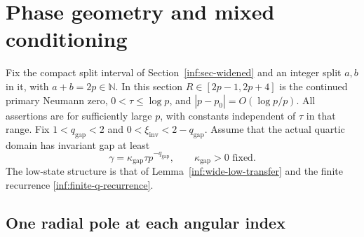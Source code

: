 \section{Phase geometry and mixed conditioning}\label{inf:sec-conditioning}

Fix the compact split interval of Section~\ref{inf:sec-widened}
and an integer split $a,b$ in it, with $a+b=2p\in\mathbb N$.
In this section $R\in[2p-1,2p+4]$ is the continued primary Neumann
zero, $0<\tau\le\log p$, and $|p-p_0|=O(\log p/p)$.
All assertions are for sufficiently large $p$, with constants
independent of $\tau$ in that range. Fix
$1<q_{\mathrm{gap}}<2$ and $0<\xi_{\mathrm{inv}}<2-q_{\mathrm{gap}}$.
Assume that the actual quartic domain has invariant gap at least
\[
 \gamma=\kappa_{\mathrm{gap}}\tau p^{-q_{\mathrm{gap}}},\qquad
 \kappa_{\mathrm{gap}}>0\text{ fixed}.
\]
The low-state structure is that of
Lemma~\ref{inf:wide-low-transfer} and the finite recurrence
\eqref{inf:finite-q-recurrence}.

\subsection{One radial pole at each angular index}

